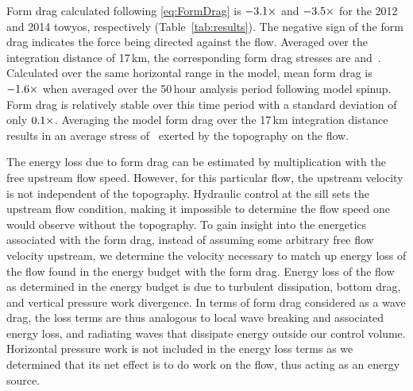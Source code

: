 \documentclass{ametsocV6.1}
\begin{document}
Form drag calculated following \eqref{eq:FormDrag} is $-3.1\times$\TyAFormDragUnit{} and $-3.5\times$\TyBFormDragUnit{} for the 2012 and 2014 towyos, respectively (Table~\ref{tab:results}).
The negative sign of the form drag indicates the force being directed against the flow.
Averaged over the integration distance of 17\,km, the corresponding form drag stresses are \TyAFormDragStress{} and \TyBFormDragStress\,\TyBFormDragStressUnit.
Calculated over the same horizontal range in the model, mean form drag is $-1.6\times$\ModelFormDragUnit{} when averaged over the 50\,hour analysis period following model spinup.
Form drag is relatively stable over this time period with a standard deviation of only $0.1\times$\ModelFormDragSigmaUnit.
Averaging the model form drag over the 17\,km integration distance results in an average stress of \ModelFormDragStress\,\ModelFormDragStressUnit{} exerted by the topography on the flow.

The energy loss due to form drag can be estimated by multiplication with the free upstream flow speed.
However, for this particular flow, the upstream velocity is not independent of the topography.
Hydraulic control at the sill sets the upstream flow condition, making it impossible to determine the flow speed one would observe without the topography.
To gain insight into the energetics associated with the form drag, instead of assuming some arbitrary free flow velocity upstream, we determine the velocity necessary to match up energy loss of the flow found in the energy budget with the form drag.
Energy loss of the flow as determined in the energy budget is due to turbulent dissipation, bottom drag, and vertical pressure work divergence.
In terms of form drag considered as a wave drag, the loss terms are thus analogous to local wave breaking and associated energy loss, and radiating waves that dissipate energy outside our control volume.
Horizontal pressure work is not included in the energy loss terms as we determined that its net effect is to do work on the flow, thus acting as an energy source.
\end{document}
